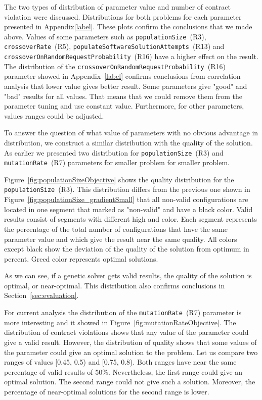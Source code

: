 The two types of distribution of parameter value and number of contract violation were discussed. Distributions for both problems for each parameter presented in Appendix\ref{label}. These plots confirm the conclusions that we made above. Values of some parameters such as \texttt{populationSize}~(R3), \texttt{crossoverRate}~(R5), \texttt{populateSoftwareSolutionAttempts}~(R13) and \texttt{crossoverOnRandomRequestProbability}~(R16) have a higher effect on the result.
The distribution  of the \texttt{crossoverOnRandomRequestProbability}~(R16) parameter showed in Appendix~\ref{label} confirms conclusions from correlation analysis that lower value gives better result. 
Some parameters give "good" and "bad" results for all values. That means that we could remove them from the parameter tuning and use constant value. Furthermore, for other parameters, values ranges could be adjusted.

To answer the question of what value of parameters with no obvious advantage in distribution, we construct a similar distribution with the quality of the solution.
As earlier we presented two distribution for \texttt{populationSize}~(R3) and \texttt{mutationRate}~(R7) parameters for smaller problem for smaller problem.

Figure~\ref{fig:populationSizeObjective} shows the quality distribution for the \texttt{populationSize}~(R3). This distribution differs from the previous one shown in Figure~\ref{fig:populationSize_gradientSmall} that all non-valid configurations are located in one segment that marked as "non-valid" and have a black color. Valid results consist of segments with different high and color. Each segment represents the percentage of the total number of configurations that have the same parameter value and which give the result near the same quality. All colors except black show the deviation of the quality of the solution from optimum in percent. Greed color represents optimal solutions.

As we can see, if a genetic solver gets valid results, the quality of the solution is optimal, or near-optimal. This distribution also confirms conclusions in Section~\ref{sec:evaluation}.

For current analysis the distribution of the \texttt{mutationRate}~(R7) parameter is more interesting and it showed in Figure~\ref{fig:mutationRateObjective}. The distribution of contract violations shows that any value of the parameter could give a valid result. However, the distribution of quality shows that some values of the parameter could give an optimal solution to the problem. Let us compare two ranges of values [0.45, 0.5) and [0.75, 0.8). Both ranges have near the same percentage of valid results of 50\%.
Nevertheless, the first range could give an optimal solution. The second range could not give such a solution. Moreover, the percentage of near-optimal solutions for the second range is lower.


